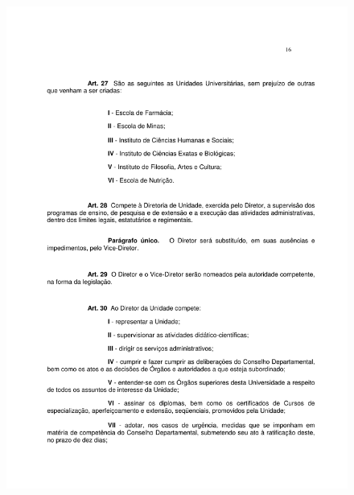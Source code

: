 \begin{figure}[p]
	\centering 
	\includegraphics[scale=0.7]{capitulos/resolucoes/cuni414/cuni414-16.pdf}
\end{figure} \pagebreak

